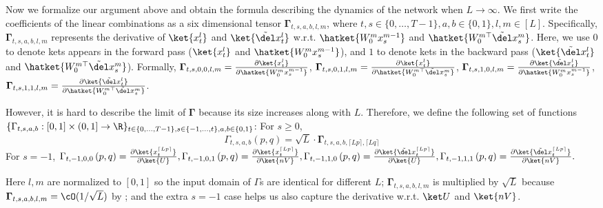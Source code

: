 Now we formalize our argument above and obtain the formula describing the dynamics of the network when $L\to \infty$. We first write the coefficients of the linear combinations as a six dimensional tensor $\mathbf \Gamma_{t,s,a,b, l, m}$, where $t,s\in \{0,\ldots, T-1\}, a,b\in \{0, 1\}, l, m\in [L]$. Specifically, $\mathbf \Gamma_{t,s,a,b, l, m}$ represents the derivative of $\ket{x_t^l}$ and  $\ket{\tilde\del x_t^l}$ w.r.t. $\hatket{W_0^mx_s^{m-1}}$ and $\hatket{W_0^{m\top}\tilde\del x_s^m}$. Here, we use $0$ to denote kets appears in the forward pass ($\ket{x_t^l}$ and $\hatket{W_0^mx_s^{m-1}}$), and $1$ to denote kets in the backward pass ($\ket{\tilde\del x_t^l}$ and $\hatket{W_0^{m\top}\tilde\del x_s^m}$). Formally, $\mathbf \Gamma_{t,s,0,0,l,m}=\frac{\partial \ket{x_t^l}}{\partial \hatket{W_0^mx_s^{m-1}}}$, $\mathbf \Gamma_{t,s,0,1,l,m}=\frac{\partial \ket{x_t^l}}{\partial \hatket{W_0^{m\top}\tilde\del x_s^m}}$, $\mathbf \Gamma_{t,s,1,0,l,m}=\frac{\partial \ket{\tilde\del x_t^l}}{\partial \hatket{W_0^{m} x_s^{m-1}}}$, $\mathbf \Gamma_{t,s,1,1,l,m}=\frac{\partial \ket{\tilde\del x_t^l}}{\partial \hatket{W_0^{m\top}\tilde\del x_s^m}}$.

However, it is hard to describe the limit of $\mathbf \Gamma$ because its size increases along with $L$. Therefore, we define the following set of functions $\{\Gamma_{t,s,a,b}:[0,1]\times (0, 1] \to \R\}_{t \in \{0,\ldots, T-1\},s\in \{-1, \ldots, t\}, a,b\in \{0,1\}}$:
For $s \geq 0$, %
\[\Gamma_{t,s,a,b}\left(p,q\right) = \sqrt L \cdot \mathbf{\Gamma}_{t,s,a,b,\lceil Lp\rceil,\lceil Lq\rceil}\]
For $s=-1$, $\Gamma_{t,-1,0,0}\left(p,q\right)=\frac{\partial \ket{x_t^{\lceil Lp\rceil}}}{\partial \ket{U}}, 
\Gamma_{t,-1,0,1}\left(p,q\right)=\frac{\partial \ket{x_t^{\lceil Lp\rceil}}}{\partial \ket{nV}}, \Gamma_{t,-1,1,0}\left(p,q\right)=\frac{\partial \ket{\tilde\del x_t^{\lceil Lp\rceil}}}{\partial \ket{U}}, 
\Gamma_{t,-1,1,1}\left(p,q\right)=\frac{\partial \ket{\tilde\del x_t^{\lceil Lp\rceil}}}{\partial \ket{nV}}.$

Here $l, m$ are normalized to $[0,1]$ so the input domain of $\Gamma$s are identical for different $L$; $\mathbf{\Gamma}_{t,s,a,b,l,m}$ is multiplied by $\sqrt L$ because $\mathbf{\Gamma}_{t,s,a,b,l,m}=\cO(1/\sqrt L)$ by ; and the extra $s=-1$ case helps us also capture the derivative w.r.t. $\ket U$ and $\ket{nV}$.

